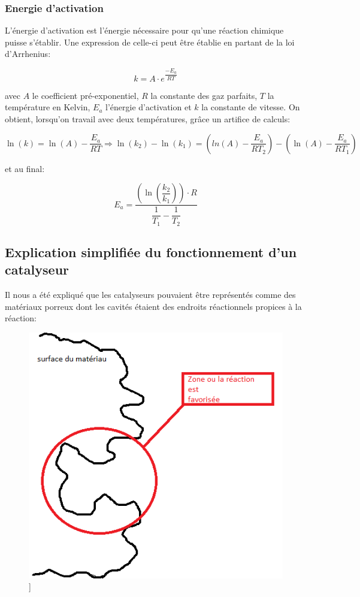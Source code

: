 \subsubsection*{Energie d'activation}
L'énergie d'activation est l'énergie nécessaire pour qu'une réaction chimique puisse s'établir. Une expression de celle-ci peut être établie en partant de la loi d'Arrhenius:

$$k=A\cdot e^{\dfrac{-E_a}{RT}}$$

avec $A$ le coefficient pré-exponentiel, $R$ la constante des gaz parfaits, $T$ la température en Kelvin, $E_a$ l'énergie d'activation et $k$ la constante de vitesse.
On obtient, lorsqu'on travail avec deux températures, grâce un artifice de calculs:

$$\ln(k) = \ln(A) - \dfrac{E_a}{RT}   \Rightarrow   \ln(k_2) - \ln(k_1) = \left( ln(A) - \dfrac{E_a}{RT_2} \right) - \left( \ln(A) - \dfrac{E_a}{RT_1} \right)$$

et au final:

$$E_a = \dfrac{\left( \ln \left( \dfrac{k_2}{k_1}\right) \right) \cdot R}{\dfrac{1}{T_1} - \dfrac{1}{T_2}}$$

\subsection*{Explication simplifiée du fonctionnement d'un catalyseur}
Il nous a été expliqué que les catalyseurs pouvaient être représentés comme des matériaux porreux dont les cavités étaient des endroits réactionnels propices à la réaction:

\begin{figure} [h]
\begin{center}
\includegraphics[scale=0.5]{cata}]
\end{center}
\end{figure}

